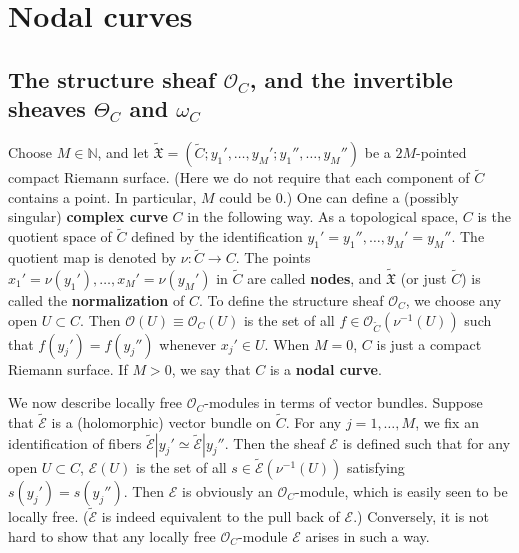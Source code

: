 \documentclass[12pt,a4paper,notitlepage]{report}
\theoremstyle{definition}
\theoremstyle{plain}
\newcommand{\fk}{\mathfrak}
\newcommand{\wtd}{\widetilde}
\newcommand{\scr}{\mathscr}
\newcommand{\Nbb}{\mathbb N}
\numberwithin{equation}{section}
\begin{document}
\section{Nodal curves}\label{lb20}

\subsection*{The structure sheaf $\scr O_C$, and the invertible sheaves $\Theta_C$ and $\omega_C$}

Choose $M\in\Nbb$, and let $\wtd{\fk X}=(\wtd C;y_1',\dots,y_M';y_1'',\dots,y_M'')$ be a $2M$-pointed compact Riemann surface. (Here we do not require that each component of $\wtd C$ contains a point. In particular, $M$ could be $0$.) One can define a (possibly singular) \textbf{complex curve} $C$ in the following way. As a topological space, $C$ is the quotient space of $\wtd C$ defined by the identification $y_1'=y_1'',\dots,y_M'=y_M''$. The quotient map is denoted by $\nu:\wtd C\rightarrow C$. The points $x_1'=\nu(y_1'),\dots,x_M'=\nu(y_M')$ in $\wtd C$ are called \textbf{nodes}, and $\wtd{\fk X}$ (or just $\wtd C$) is called the \textbf{normalization} of $C$. To define the structure sheaf $\scr O_C$, we choose any open $U\subset C$. Then $\scr O(U)\equiv\scr O_C(U)$ is the set of all  $f\in\scr O_{\wtd C}(\nu^{-1}(U))$ such that $f(y_j')=f(y_j'')$ whenever $x_j'\in U$. When $M=0$, $C$ is just a compact Riemann surface. If $M>0$, we say that $C$ is a \textbf{nodal curve}.


We now describe locally free $\scr O_C$-modules in terms of vector bundles. Suppose that $\wtd {\scr E}$ is a (holomorphic) vector bundle on $\wtd C$. For any $j=1,\dots,M$, we fix an identification of fibers $\wtd{\scr E}|y_j'\simeq \wtd{\scr E}|y_j''$. Then the sheaf $\scr E$ is defined such that for any open $U\subset C$, $\scr E(U)$ is the set of all $s\in\wtd{\scr E}(\nu^{-1}(U))$ satisfying $s(y_j')=s(y_j'')$. Then $\scr E$ is obviously an $\scr O_C$-module, which is easily seen to be locally free.  ($\wtd{\scr E}$ is indeed equivalent to the pull back of $\scr E$.) Conversely, it is not hard to show that any locally free $\scr O_C$-module $\scr E$ arises in such a way. 
\end{document}
